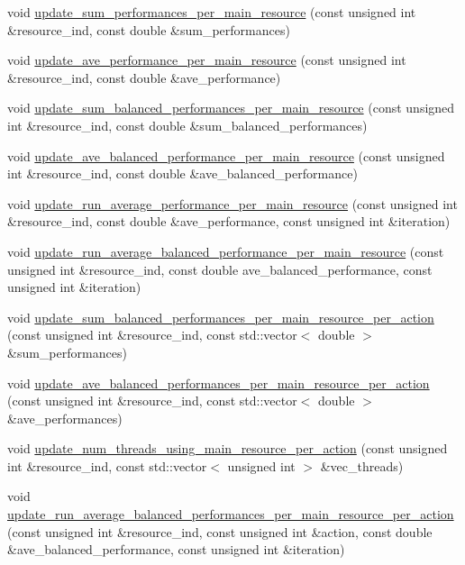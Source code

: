 \begin{DoxyCompactItemize}
\item 
void \hyperlink{structStruct__OverallPerformance_adbf1ef74ab376a91a004e66c2307bda8}{update\-\_\-sum\-\_\-performances\-\_\-per\-\_\-main\-\_\-resource} (const unsigned int \&resource\-\_\-ind, const double \&sum\-\_\-performances)
\item 
void \hyperlink{structStruct__OverallPerformance_ac89f69c2e0042fb2294a280259c59014}{update\-\_\-ave\-\_\-performance\-\_\-per\-\_\-main\-\_\-resource} (const unsigned int \&resource\-\_\-ind, const double \&ave\-\_\-performance)
\item 
void \hyperlink{structStruct__OverallPerformance_a2657703dcd0c2d95fd91e7cf7d36f104}{update\-\_\-sum\-\_\-balanced\-\_\-performances\-\_\-per\-\_\-main\-\_\-resource} (const unsigned int \&resource\-\_\-ind, const double \&sum\-\_\-balanced\-\_\-performances)
\item 
void \hyperlink{structStruct__OverallPerformance_a600d40acdcd532ad9a69451192e5c72f}{update\-\_\-ave\-\_\-balanced\-\_\-performance\-\_\-per\-\_\-main\-\_\-resource} (const unsigned int \&resource\-\_\-ind, const double \&ave\-\_\-balanced\-\_\-performance)
\item 
void \hyperlink{structStruct__OverallPerformance_ac454dbd325a845a55aa4270a2776eb10}{update\-\_\-run\-\_\-average\-\_\-performance\-\_\-per\-\_\-main\-\_\-resource} (const unsigned int \&resource\-\_\-ind, const double \&ave\-\_\-performance, const unsigned int \&iteration)
\item 
void \hyperlink{structStruct__OverallPerformance_a935b197290050caf10fc7449c3888fbe}{update\-\_\-run\-\_\-average\-\_\-balanced\-\_\-performance\-\_\-per\-\_\-main\-\_\-resource} (const unsigned int \&resource\-\_\-ind, const double ave\-\_\-balanced\-\_\-performance, const unsigned int \&iteration)
\item 
void \hyperlink{structStruct__OverallPerformance_a4d1d91cfa679c3ecc8672ab20935aef1}{update\-\_\-sum\-\_\-balanced\-\_\-performances\-\_\-per\-\_\-main\-\_\-resource\-\_\-per\-\_\-action} (const unsigned int \&resource\-\_\-ind, const std\-::vector$<$ double $>$ \&sum\-\_\-performances)
\item 
void \hyperlink{structStruct__OverallPerformance_ab1ac4196ecdc79d80b79bada3a05fbd9}{update\-\_\-ave\-\_\-balanced\-\_\-performances\-\_\-per\-\_\-main\-\_\-resource\-\_\-per\-\_\-action} (const unsigned int \&resource\-\_\-ind, const std\-::vector$<$ double $>$ \&ave\-\_\-performances)
\item 
void \hyperlink{structStruct__OverallPerformance_aafe90e8e3cc2632788e1f9018613db68}{update\-\_\-num\-\_\-threads\-\_\-using\-\_\-main\-\_\-resource\-\_\-per\-\_\-action} (const unsigned int \&resource\-\_\-ind, const std\-::vector$<$ unsigned int $>$ \&vec\-\_\-threads)
\item 
void \hyperlink{structStruct__OverallPerformance_a9e7fb7b45be4dfab7234e626cd576aeb}{update\-\_\-run\-\_\-average\-\_\-balanced\-\_\-performances\-\_\-per\-\_\-main\-\_\-resource\-\_\-per\-\_\-action} (const unsigned int \&resource\-\_\-ind, const unsigned int \&action, const double \&ave\-\_\-balanced\-\_\-performance, const unsigned int \&iteration)
\end{DoxyCompactItemize}

